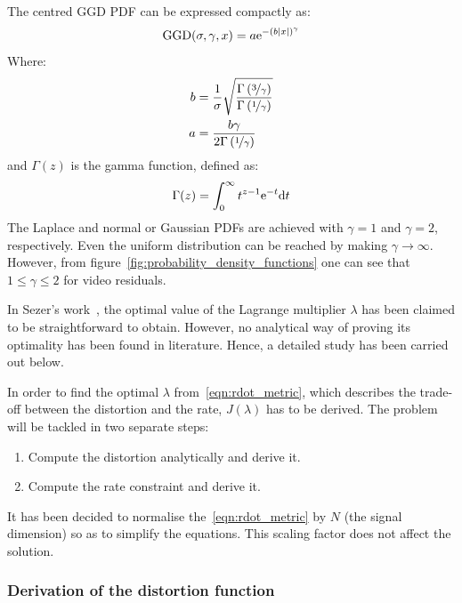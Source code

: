\documentclass[11pt,a4paper,openright,twoside]{book}
\numberwithin{equation}{section} %
\numberwithin{figure}{section} %
\numberwithin{table}{section} %
\begin{document}
The centred \ac{GGD} \ac{PDF} can be expressed compactly as:
\begin{equation}
	\text{GGD}(\sigma,\gamma,x)=
	a\text{e}^{-{\left(b\vert x \vert\right)}^\gamma}
	\label{eqn:ggd}
\end{equation}
Where:
\begin{align}
	b &= \frac{1}{\sigma}\sqrt{
	\frac{\Gamma\left(\nicefrac{3}{\gamma}\right)}
	{\Gamma \left(\nicefrac{1}{\gamma}\right)}} \\
	a &= \frac{b\gamma}{2\Gamma \left(\nicefrac{1}{\gamma}\right)}
\end{align}
and $\Gamma(z)$ is the gamma function, defined as:
\begin{equation}
	\Gamma(z) = \int_0^\infty t^{z-1}\text{e}^{-t}\text{d} t
\end{equation}
The Laplace and normal or Gaussian \acp{PDF} are achieved with
$\gamma=1$ and $\gamma=2$, respectively.
Even the uniform distribution can be reached by making $\gamma\to\infty$.
However, from figure~\ref{fig:probability_density_functions} one can see
that $1\le\gamma\le2$ for video residuals.

In Sezer's work~\cite{sezer-11-phd,sezer-08-sparse-orthonormal-transforms},
the optimal value of the Lagrange multiplier $\lambda$ has been claimed
to be straightforward to obtain.
However, no analytical way of proving its optimality has been found in
literature.
Hence, a detailed study has been carried out below.

In order to find the optimal $\lambda$ from~\eqref{eqn:rdot_metric},
which describes the trade-off between the distortion and the rate,
$J(\lambda)$ has to be derived.
The problem will be tackled in two separate steps:
\begin{enumerate}
	\item Compute the distortion analytically and derive it.
	\item Compute the rate constraint and derive it.
\end{enumerate}
It has been decided to normalise the~\eqref{eqn:rdot_metric} by $N$ (the
signal dimension) so as to simplify the equations.
This scaling factor does not affect the solution.

\subsubsection{Derivation of the distortion function}
\label{ssub:derivation_of_the_distortion_function}
\end{document}
